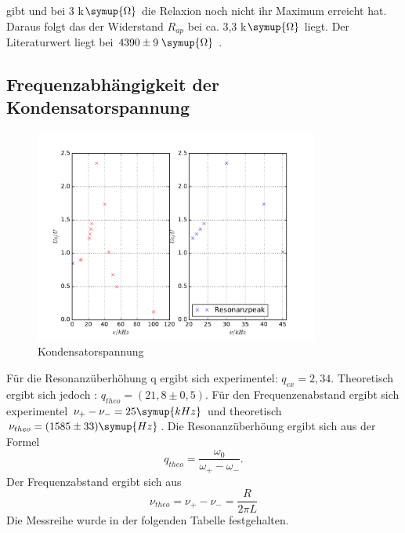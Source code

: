       gibt und bei 3 k$\symup{\Omega}$ die Relaxion noch nicht
      ihr Maximum erreicht hat. Daraus folgt das der Widerstand $R_{ap}$ bei ca.
      3,3 k$\symup{\Omega}$ liegt. Der Literaturwert liegt bei
      $4390 \pm 9 \;\symup{\Omega}$ .

  \subsection{Frequenzabhängigkeit der Kondensatorspannung}
  \begin{figure}
    \centering
    \includegraphics[height=7cm]{./plots/5cplot.pdf}
      \caption{Kondensatorspannung}
      \label{fig:5cplot}
    \end{figure}
    \FloatBarrier
    Für die Resonanzüberhöhung q ergibt sich experimentel: $q_{ex}= 2,34 $.
    Theoretisch ergibt sich jedoch : $q_{theo}= (21,8  \pm 0,5) $.
    Für den Frequenzenabstand ergibt sich experimentel $ \nu_+ - \nu_- = 25 \symup{kHz} $
    und theoretisch $ \nu_{theo}= (1585 \pm 33)\symup{Hz}$.
    Die Resonanzüberhöung ergibt sich aus der Formel
    \begin{equation*}
      q_{theo} = \frac{\omega_0}{\omega_+ - \omega_-}.
    \end{equation*}
    Der Frequenzabstand ergibt sich aus
    \begin{equation*}
      \nu_{theo} = \nu_+ - \nu_- = \frac{R}{2\pi L}
    \end{equation*}
    Die Messreihe wurde in der folgenden Tabelle festgehalten.
